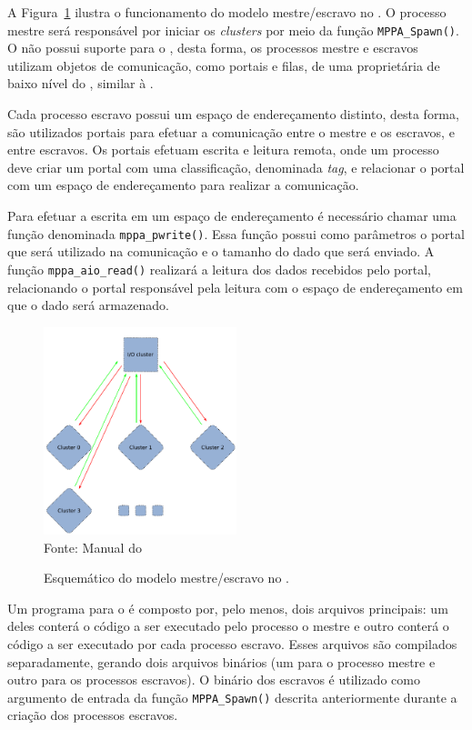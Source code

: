 A Figura~\ref{fig:MPPAIPCTutorial} ilustra o funcionamento do modelo mestre/escravo
no \mppa. O processo mestre será responsável por iniciar os
\textit{clusters} por meio da função \texttt{MPPA\_Spawn()}.
O \mppa não possui suporte para o \mpi, desta forma, os processos mestre e
escravos utilizam objetos de comunicação, como portais e filas, de
uma \api proprietária de baixo nível do \mppa, similar à \posix \ipc.

Cada processo escravo possui um espaço de endereçamento distinto, desta forma,
são utilizados portais para efetuar a comunicação entre o mestre e os escravos, e entre escravos. Os
portais efetuam escrita e leitura remota, onde um processo deve criar um portal
com uma classificação, denominada \textit{tag}, e relacionar o portal com um
espaço de endereçamento para realizar a comunicação.

Para efetuar a escrita em um espaço de endereçamento é necessário chamar uma
função denominada \texttt{mppa\_pwrite()}. Essa função possui como parâmetros o
portal que será utilizado na comunicação e o tamanho do dado que será enviado.
A função \texttt{mppa\_aio\_read()} realizará a leitura dos dados recebidos pelo
portal, relacionando o portal responsável pela leitura com o espaço de
endereçamento em que o dado será armazenado.

\begin{figure}
	\centering
	\caption{Esquemático do modelo mestre/escravo no \mppa.}
	\includegraphics[width=0.5\textwidth]{figs/MPPAIPCTutorial.pdf} \\
    Fonte: Manual do \mppa
	\label{fig:MPPAIPCTutorial}
\end{figure}

Um programa para o \mppa é composto por, pelo menos, dois arquivos principais:
um deles conterá o código a ser executado pelo processo o mestre e outro conterá o código
a ser executado por cada processo escravo. Esses arquivos são compilados separadamente,
gerando dois arquivos binários (um para o processo mestre e outro para os processos escravos).
O binário dos escravos é utilizado como argumento de entrada da função \texttt{MPPA\_Spawn()}
descrita anteriormente durante a criação dos processos escravos.

